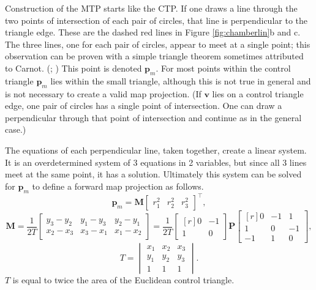 \documentclass[]{interact}
\begin{document}
Construction of the MTP starts like the CTP. If one draws a line through the two
points of intersection of each pair of circles, that line is perpendicular to
the triangle edge. These are the dashed red lines in Figure
\ref{fig:chamberlin}b and c. The three lines, one for each pair of circles,
appear to meet at a single point; this observation can be proven with a simple
triangle theorem sometimes attributed to Carnot. (\citealp{posamentier};
\citealp{wohlgemuth}) This point is denoted $\mathbf p_m$. For most points
within the control triangle $\mathbf p_m$ lies within the small triangle,
although this is not true in general and is not necessary to create a valid map
projection. (If $\mathbf v$ lies on a control triangle edge, one pair of circles
has a single point of intersection. One can draw a perpendicular through
that point of intersection and continue as in the general case.)

The equations of each perpendicular line, taken together, create a linear
system. It is an overdetermined system of 3 equations in 2 variables, but since
all 3 lines meet at the same point, it has a solution. Ultimately this system
can be solved for $\mathbf p_m$ to define a forward map projection as follows.
\begin{equation}\label{eq:forward}
\mathbf p_m =
\mathbf M \begin{bmatrix*} r^2_1 & r^2_2 & r^2_3 \end{bmatrix*}^\top,
\end{equation}
\begin{equation}\label{eq:forwardm}
\mathbf M = \frac{1}{2T}
\begin{bmatrix*} y_3 - y_2 & y_1 - y_3 & y_2 - y_1 \\
x_2 - x_3 & x_3 - x_1 & x_1 - x_2 \end{bmatrix*} = \frac{1}{2T}
\begin{bmatrix*}[r] 0 & -1  \\
1 & 0 \end{bmatrix*}
\mathbf P
\begin{bmatrix*}[r] 0 & -1 & 1 \\
1 & 0 & -1 \\
-1 & 1 & 0 \end{bmatrix*},
\end{equation}
\begin{equation}\label{eq:forwardt}
T = \begin{vmatrix*} x_1 & x_2 & x_3 \\
 y_1 & y_2 & y_3 \\
 1 & 1 & 1
\end{vmatrix*}.
\end{equation}
$T$ is equal to twice the area of the Euclidean control triangle.
\end{document}
